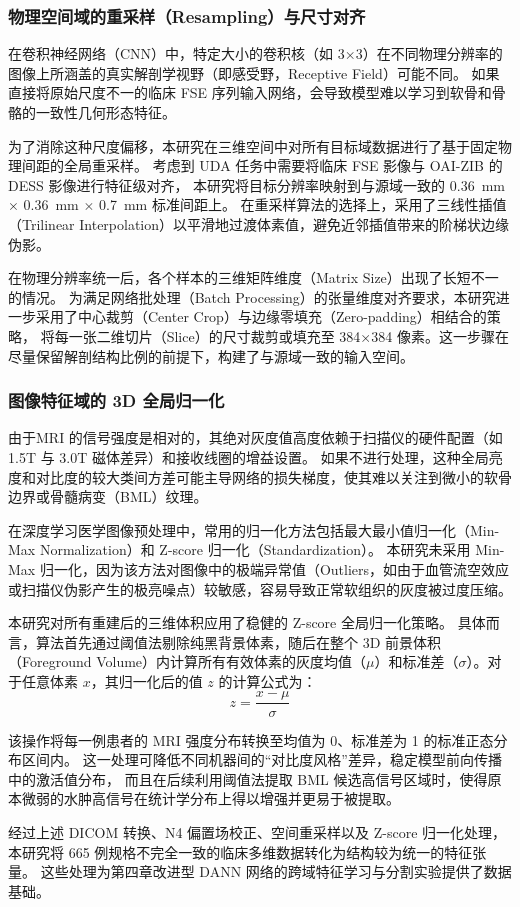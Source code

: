     \subsubsection{物理空间域的重采样（Resampling）与尺寸对齐}
      在卷积神经网络（CNN）中，特定大小的卷积核（如 3×3）在不同物理分辨率的图像上所涵盖的真实解剖学视野（即感受野，Receptive Field）可能不同。
      如果直接将原始尺度不一的临床 FSE 序列输入网络，会导致模型难以学习到软骨和骨骼的一致性几何形态特征。
      \par 为了消除这种尺度偏移，本研究在三维空间中对所有目标域数据进行了基于固定物理间距的全局重采样。
      考虑到 UDA 任务中需要将临床 FSE 影像与 OAI-ZIB 的 DESS 影像进行特征级对齐，
      本研究将目标分辨率映射到与源域一致的 \qty{0.36}{\milli\metre} $\times$ \qty{0.36}{\milli\metre} $\times$ \qty{0.7}{\milli\metre} 标准间距上。
      在重采样算法的选择上，采用了三线性插值（Trilinear Interpolation）以平滑地过渡体素值，避免近邻插值带来的阶梯状边缘伪影。
      \par 在物理分辨率统一后，各个样本的三维矩阵维度（Matrix Size）出现了长短不一的情况。
      为满足网络批处理（Batch Processing）的张量维度对齐要求，本研究进一步采用了中心裁剪（Center Crop）与边缘零填充（Zero-padding）相结合的策略，
      将每一张二维切片（Slice）的尺寸裁剪或填充至 384×384 像素。这一步骤在尽量保留解剖结构比例的前提下，构建了与源域一致的输入空间。
      \subsubsection{图像特征域的 3D 全局归一化}
        由于MRI 的信号强度是相对的，其绝对灰度值高度依赖于扫描仪的硬件配置（如 1.5T 与 3.0T 磁体差异）和接收线圈的增益设置。
        如果不进行处理，这种全局亮度和对比度的较大类间方差可能主导网络的损失梯度，使其难以关注到微小的软骨边界或骨髓病变（BML）纹理。
        \par 在深度学习医学图像预处理中，常用的归一化方法包括最大最小值归一化（Min-Max Normalization）和 Z-score 归一化（Standardization）。
        本研究未采用 Min-Max 归一化，因为该方法对图像中的极端异常值（Outliers，如由于血管流空效应或扫描仪伪影产生的极亮噪点）较敏感，容易导致正常软组织的灰度被过度压缩。
        \par 本研究对所有重建后的三维体积应用了稳健的 Z-score 全局归一化策略。
        具体而言，算法首先通过阈值法剔除纯黑背景体素，随后在整个 3D 前景体积（Foreground Volume）内计算所有有效体素的灰度均值（$\mu$）和标准差（$\sigma$）。对于任意体素 $x$，其归一化后的值 $z$ 的计算公式为：
        \begin{equation}
          z = \frac{x - \mu}{\sigma}
        \end{equation}
        \par 该操作将每一例患者的 MRI 强度分布转换至均值为 0、标准差为 1 的标准正态分布区间内。
        这一处理可降低不同机器间的“对比度风格”差异，稳定模型前向传播中的激活值分布，
        而且在后续利用阈值法提取 BML 候选高信号区域时，使得原本微弱的水肿高信号在统计学分布上得以增强并更易于被提取。
        \par 经过上述 DICOM 转换、N4 偏置场校正、空间重采样以及 Z-score 归一化处理，本研究将 665 例规格不完全一致的临床多维数据转化为结构较为统一的特征张量。
        这些处理为第四章改进型 DANN 网络的跨域特征学习与分割实验提供了数据基础。
